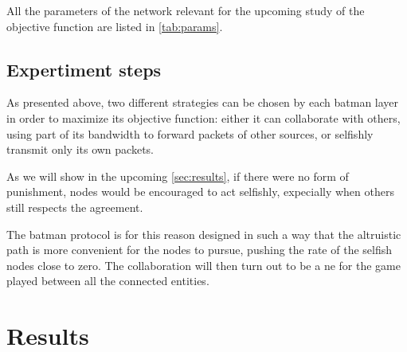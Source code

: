 \documentclass[conference]{IEEEtran}
\begin{document}
All the parameters of the network relevant for the upcoming study of the objective function are listed in \autoref{tab:params}.

\renewcommand\theadalign{l}

\begin{table}[h]
\vspace{0.1cm}
\caption{Relevant parameters for building the network}
\label{tab:params}
\end{table}

\subsection{Expertiment steps}

As presented above, two different strategies can be chosen by each \gls{batman} layer in order to maximize its objective function: either it can collaborate with others, using part of its bandwidth to forward packets of other sources, or selfishly transmit only its own packets.

As we will show in the upcoming \autoref{sec:results}, if there were no form of punishment, nodes would be encouraged to act selfishly, expecially when others still respects the agreement.

The \gls{batman} protocol is for this reason designed in such a way that the altruistic path is more convenient for the nodes to pursue, pushing the rate of the selfish nodes close to zero. The collaboration will then turn out to be a \gls{ne} for the game played between all the connected entities.

\section{Results} \label{sec:results}
\end{document}
